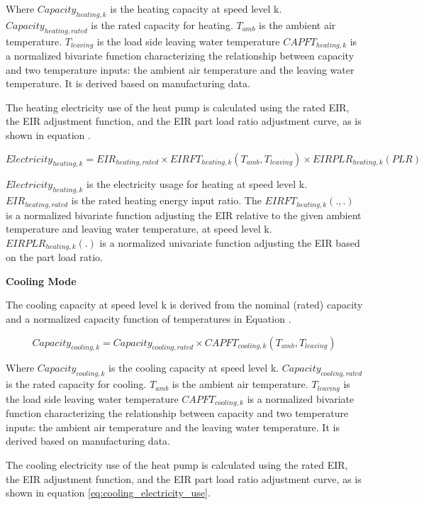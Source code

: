 Where $Capacity_{heating,k}$ is the heating capacity at speed level k.
$Capacity_{heating,rated}$ is the rated capacity for heating. $T_{amb}$ is the ambient air
temperature. $T_{leaving}$ is the load side leaving water temperature $CAPFT_{heating,k}$
is a normalized bivariate function characterizing the relationship between
capacity and two temperature inputs: the ambient air temperature and the leaving
water temperature. It is derived based on manufacturing data.

The heating electricity use of the heat pump is calculated using the rated EIR,
the EIR adjustment function, and the EIR part load ratio adjustment curve, as is
shown in equation .

\begin{equation}\label{eq:heating_electricity_use}
Electricity_{heating,k}=EIR_{heating,rated} \times EIRFT_{heating,k}(T_{amb}, T_{leaving}) \times EIRPLR_{heating,k}(PLR)       
\end{equation}

$Electricity_{heating,k}$ is the electricity usage for heating at speed level k.
$EIR_{heating,rated}$ is the rated heating energy input ratio. The
$EIRFT_{heating,k}(., .)$ is a normalized bivariate function adjusting the EIR
relative to the given ambient temperature and leaving water temperature, at
speed level k. $EIRPLR_{heating,k}(.)$ is a normalized univariate function
adjusting the EIR based on the part load ratio.

\noindent\textbf{Cooling Mode}

The cooling capacity at speed level k is derived from the nominal (rated)
capacity and a normalized capacity function of temperatures in Equation .

\begin{equation}
Capacity_{cooling,k}=Capacity_{cooling,rated} \times CAPFT_{cooling,k}(T_{amb},T_{leaving})	                 
\end{equation}

Where $Capacity_{cooling,k}$ is the cooling capacity at speed level k.
$Capacity_{cooling,rated}$ is the rated capacity for cooling. $T_{amb}$ is the ambient air
temperature. $T_{leaving}$ is the load side leaving water temperature $CAPFT_{cooling,k}$
is a normalized bivariate function characterizing the relationship between
capacity and two temperature inputs: the ambient air temperature and the leaving
water temperature. It is derived based on manufacturing data.

The cooling electricity use of the heat pump is calculated using the rated EIR,
the EIR adjustment function, and the EIR part load ratio adjustment curve, as is
shown in equation \ref{eq:cooling_electricity_use}.

